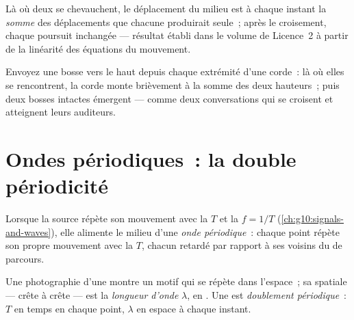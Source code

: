 \begin{proposition}\label{prop:g12:mechanical-waves:superposition}
Là où deux  se chevauchent, le déplacement du milieu est à
chaque instant la \emph{somme} des déplacements que chacune produirait
seule~; après le croisement, chaque  poursuit inchangée ---
résultat établi dans le volume de Licence~2 à partir de la linéarité des
équations du mouvement. \admitted
\end{proposition}

\begin{example}\label{ex:g12:mechanical-waves:crossing}
Envoyez une bosse vers le haut depuis chaque extrémité d'une corde~:
là où elles se rencontrent, la corde monte brièvement à la somme des
deux hauteurs~; puis deux bosses intactes émergent --- comme deux
conversations qui se croisent et atteignent leurs auditeurs.
\end{example}

\section{Ondes périodiques~: la double périodicité}

\begin{definition}\label{def:g12:mechanical-waves:periodic}
Lorsque la source répète son mouvement avec la  $T$ et la
 $f = 1/T$ (\cref{ch:g10:signals-and-waves}), elle alimente le
milieu d'une \emph{onde périodique}~: chaque point
répète son propre mouvement avec la  $T$, chacun retardé
par rapport à ses voisins du  de parcours.
\end{definition}

\begin{definition}\label{def:g12:mechanical-waves:wavelength}
Une photographie d'une  montre un motif qui se
répète dans l'espace~; sa  spatiale --- crête à crête ---
est la \emph{longueur d'onde} $\lambda$, en
. Une  est
\emph{doublement périodique}~:  $T$
en temps en chaque point,  $\lambda$ en espace à chaque
instant.
\end{definition}

